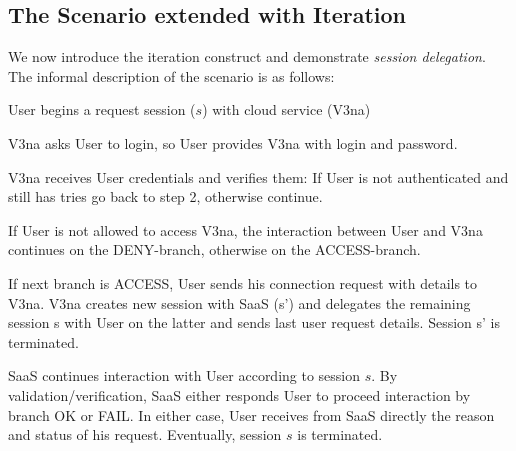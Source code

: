 \documentclass[10pt]{llncs}
\begin{document}
\subsection{The Scenario extended with Iteration}
We now introduce the iteration construct and demonstrate \textit{session delegation}.
The informal description of the scenario is as follows:
\begin{compactenum}
\item  User begins a request session ($s$) with cloud service (V3na)

\item  V3na asks User to login, so User provides V3na with login and password.

\item  V3na receives User credentials and verifies them: If User is not authenticated and still has tries %
go back to step 2, otherwise continue.

\item  If User is not allowed to access V3na, the interaction between User and V3na continues on the DENY-branch, otherwise on the ACCESS-branch.

\item  If next branch is ACCESS, User sends his connection request with details to V3na. V3na creates new session with SaaS (s') and delegates the remaining session s with User on the latter and sends last user request details. Session s' is terminated.

\item  SaaS continues interaction with User according to session $s$. By validation/verification, SaaS either responds User to proceed interaction by branch OK or FAIL. In either case, User receives from SaaS directly the reason and status of his request. Eventually, session $s$ is terminated.
\end{compactenum}
\end{document}
